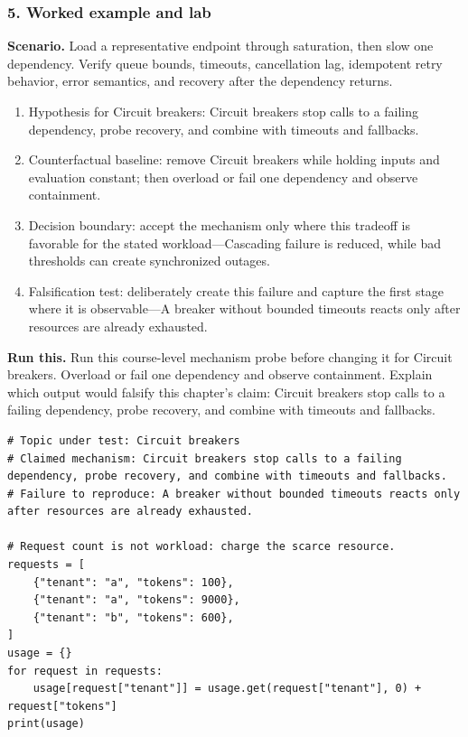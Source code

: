 \subsubsection*{5. Worked example and lab}
\textbf{Scenario.} Load a representative endpoint through saturation, then slow one dependency. Verify queue bounds, timeouts, cancellation lag, idempotent retry behavior, error semantics, and recovery after the dependency returns.
\begin{enumerate}
\item Hypothesis for Circuit breakers: Circuit breakers stop calls to a failing dependency, probe recovery, and combine with timeouts and fallbacks.
\item Counterfactual baseline: remove Circuit breakers while holding inputs and evaluation constant; then overload or fail one dependency and observe containment.
\item Decision boundary: accept the mechanism only where this tradeoff is favorable for the stated workload—Cascading failure is reduced, while bad thresholds can create synchronized outages.
\item Falsification test: deliberately create this failure and capture the first stage where it is observable—A breaker without bounded timeouts reacts only after resources are already exhausted.
\end{enumerate}
\textbf{Run this.} Run this course-level mechanism probe before changing it for Circuit breakers. Overload or fail one dependency and observe containment. Explain which output would falsify this chapter's claim: Circuit breakers stop calls to a failing dependency, probe recovery, and combine with timeouts and fallbacks.
\begin{Verbatim}[fontsize=\scriptsize]
# Topic under test: Circuit breakers
# Claimed mechanism: Circuit breakers stop calls to a failing dependency, probe recovery, and combine with timeouts and fallbacks.
# Failure to reproduce: A breaker without bounded timeouts reacts only after resources are already exhausted.

# Request count is not workload: charge the scarce resource.
requests = [
    {"tenant": "a", "tokens": 100},
    {"tenant": "a", "tokens": 9000},
    {"tenant": "b", "tokens": 600},
]
usage = {}
for request in requests:
    usage[request["tenant"]] = usage.get(request["tenant"], 0) + request["tokens"]
print(usage)
\end{Verbatim}
